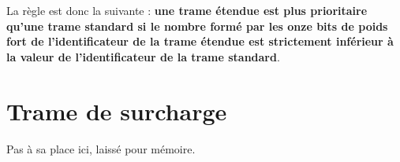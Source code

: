 La règle est donc la suivante : {\bf une trame étendue est plus prioritaire qu'une trame standard si le nombre formé par les onze bits de poids fort de l'identificateur de la trame étendue est strictement inférieur à la valeur de l'identificateur de la trame standard}.






\section{Trame de surcharge}

Pas à sa place ici, laissé pour mémoire. \cite{pasFini}



